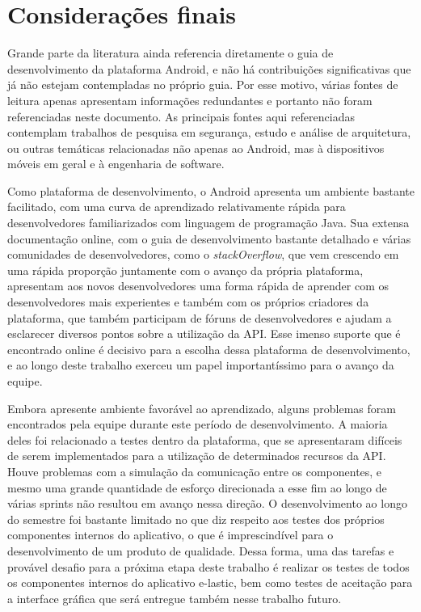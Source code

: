 \chapter{Considerações finais}
\label{consideracoes-finais}


Grande parte da literatura ainda referencia diretamente o guia de desenvolvimento da plataforma Android, e não há contribuições significativas que já não estejam contempladas no próprio guia. Por esse motivo, várias fontes de leitura apenas apresentam informações redundantes e portanto não foram referenciadas neste documento. As principais fontes aqui referenciadas contemplam trabalhos de pesquisa em segurança, estudo e análise de arquitetura, ou outras temáticas relacionadas não apenas ao Android, mas à dispositivos móveis em geral e à engenharia de software.

Como plataforma de desenvolvimento, o Android apresenta um ambiente bastante facilitado, com uma curva de aprendizado relativamente rápida para desenvolvedores familiarizados com linguagem de programação Java. Sua extensa documentação online, com o guia de desenvolvimento bastante detalhado e várias comunidades de desenvolvedores, como o \textit{stackOverflow}, que vem crescendo em uma rápida proporção juntamente com o avanço da própria plataforma, apresentam aos novos desenvolvedores uma forma rápida de aprender com os desenvolvedores mais experientes e também com os próprios criadores da plataforma, que também participam de fóruns de desenvolvedores e ajudam a esclarecer diversos pontos sobre a utilização da API. Esse imenso suporte que é encontrado online é decisivo para a escolha dessa plataforma de desenvolvimento, e ao longo deste trabalho exerceu um papel importantíssimo para o avanço da equipe.

Embora apresente ambiente favorável ao aprendizado, alguns problemas foram encontrados pela equipe durante este período de desenvolvimento. A maioria deles foi relacionado a testes dentro da plataforma, que se apresentaram difíceis de serem implementados para a utilização de determinados recursos da API. Houve problemas com a simulação da comunicação entre os componentes, e mesmo uma grande quantidade de esforço direcionada a esse fim ao longo de várias sprints não resultou em avanço nessa direção. O desenvolvimento ao longo do semestre foi bastante limitado no que diz respeito aos testes dos próprios componentes internos do aplicativo, o que é imprescindível para o desenvolvimento de um produto de qualidade. Dessa forma, uma das tarefas e provável desafio para a próxima etapa deste trabalho é realizar os testes de todos os componentes internos do aplicativo e-lastic, bem como testes de aceitação para a interface gráfica que será entregue também nesse trabalho futuro. 

